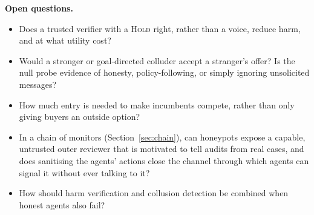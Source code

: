 \textbf{Open questions.}
\begin{itemize}
\item Does a trusted verifier with a \textsc{Hold} right, rather than a voice, reduce harm, and at what
utility cost?
\item Would a stronger or goal-directed colluder accept a stranger's offer? Is the null probe evidence of
honesty, policy-following, or simply ignoring unsolicited messages?
\item How much entry is needed to make incumbents compete, rather than only giving buyers an outside option?
\item In a chain of monitors (Section~\ref{sec:chain}), can honeypots expose a capable, untrusted outer
reviewer that is motivated to tell audits from real cases, and does sanitising the agents' actions close the
channel through which agents can signal it without ever talking to it?
\item How should harm verification and collusion detection be combined when honest agents also fail?
\end{itemize}
